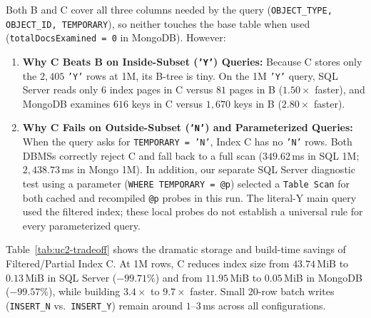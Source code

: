 Both B and C cover all three columns needed by the query (\texttt{OBJECT\_TYPE, OBJECT\_ID, TEMPORARY}), so neither touches the base table when used (\texttt{totalDocsExamined = 0} in MongoDB). However:
\begin{enumerate}
\item \textbf{Why C Beats B on Inside-Subset (\texttt{'Y'}) Queries:} Because C stores only the $2,405$ \texttt{'Y'} rows at 1M, its B-tree is tiny. On the 1M \texttt{'Y'} query, SQL Server reads only $6$ index pages in C versus $81$ pages in B ($1.50\times$ faster), and MongoDB examines $616$ keys in C versus $1,670$ keys in B ($2.80\times$ faster).
\item \textbf{Why C Fails on Outside-Subset (\texttt{'N'}) and Parameterized Queries:} When the query asks for \texttt{TEMPORARY = 'N'}, Index C has no \texttt{'N'} rows. Both DBMSs correctly reject C and fall back to a full scan ($349.62$\,ms in SQL 1M; $2,438.73$\,ms in Mongo 1M). In addition, our separate SQL Server diagnostic test using a parameter (\texttt{WHERE TEMPORARY = @p}) selected a \texttt{Table Scan} for both cached and recompiled \texttt{@p} probes in this run. The literal-Y main query used the filtered index; these local probes do not establish a universal rule for every parameterized query.
\end{enumerate}

Table~\ref{tab:uc2-tradeoff} shows the dramatic storage and build-time savings of Filtered/Partial Index C. At 1M rows, C reduces index size from $43.74$\,MiB to $0.13$\,MiB in SQL Server (\textbf{$-99.71\%$}) and from $11.95$\,MiB to $0.05$\,MiB in MongoDB (\textbf{$-99.57\%$}), while building $3.4\times$ to $9.7\times$ faster. Small 20-row batch writes (\texttt{INSERT\_N} vs.\ \texttt{INSERT\_Y}) remain around $1$--$3$\,ms across all configurations.

